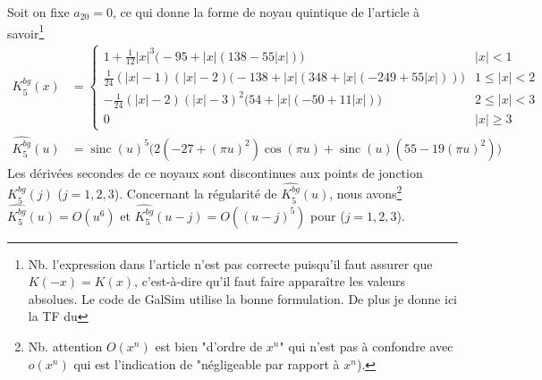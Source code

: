 \documentclass[11pt,twoside]{article}
\DeclareMathOperator{\sinc}{sinc}
\newcommand{\nn}{\nonumber}
\begin{document}
Soit on fixe $a_{20}=0$, ce qui donne la forme de noyau quintique de l'article \cite{2014PASP..126..287B} à savoir\footnote{Nb. l'expression dans l'article n'est pas correcte puisqu'il faut assurer que $K(-x)=K(x)$, c'est-à-dire qu'il faut faire apparaître les valeurs absolues. Le code de \textsf{GalSim} utilise la bonne formulation. De plus je donne ici la TF du }
\begin{align}
K^{bg}_5(x) &= \begin{cases}
1 + \frac{1}{12}|x|^3 \Big(-95+|x|(138-55|x|)\Big) & |x|< 1 \\
\frac{1}{24}(|x|-1)(|x|-2)\Big(-138+|x|(348+|x|(-249+55|x|))\Big)& 1\leq |x|<2 \\
-\frac{1}{24}(|x|-2)(|x|-3)^2\Big(54+|x|(-50+11|x|)\Big) & 2\leq |x|<3 \nn \\
0 & |x| \geq 3
\end{cases}\\
\widehat{K^{bg}_5}(u)&=\sinc(u)^5 \Big(2(-27+(\pi u)^2)\cos(\pi u)+\sinc(u)(55-19(\pi u)^2)\Big)
\label{eq:quinticBG-kernel}
\end{align}
Les dérivées secondes de ce noyaux sont discontinues aux points de jonction $K^{bg}_5(j)$ ($j=1,2,3$). Concernant la régularité de $\widehat{K^{bg}_5}(u)$, nous avons\footnote{Nb. attention $O(x^n)$ est bien "d'ordre de $x^n$" qui n'est pas à confondre avec $o(x^n)$ qui est l'indication de "négligeable par rapport à $x^n$).} $\widehat{K^{bg}_5}(u)=O(u^6)$ et $\widehat{K^{bg}_5}(u-j)=O((u-j)^5)$ pour ($j=1,2,3$). 
\end{document}
